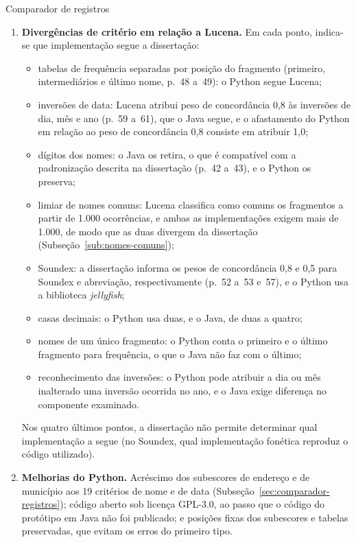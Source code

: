 \begin{chapter}{Comparador de registros}
\begin{enumerate}
\item \textbf{Divergências de critério em relação a Lucena.} Em cada ponto, indica-se que implementação segue a dissertação:
\begin{itemize}
\item tabelas de frequência separadas por posição do fragmento (primeiro, intermediários e último nome, p.~48 a~49): o Python segue Lucena;
\item inversões de data: Lucena atribui peso de concordância 0,8 às inversões de dia, mês e ano (p.~59 a~61), que o Java segue, e o afastamento do Python em relação ao peso de concordância 0,8 consiste em atribuir 1,0;
\item dígitos dos nomes: o Java os retira, o que é compatível com a padronização descrita na dissertação (p.~42 a~43), e o Python os preserva;
\item limiar de nomes comuns: Lucena classifica como comuns os fragmentos a partir de 1.000 ocorrências, e ambas as implementações exigem mais de 1.000, de modo que as duas divergem da dissertação (Subseção~\ref{sub:nomes-comuns});
\item Soundex: a dissertação informa os pesos de concordância 0,8 e 0,5 para Soundex e abreviação, respectivamente (p.~52 a~53 e~57), e o Python usa a biblioteca \textit{jellyfish};
\item casas decimais: o Python usa duas, e o Java, de duas a quatro;
\item nomes de um único fragmento: o Python conta o primeiro e o último fragmento para frequência, o que o Java não faz com o último;
\item reconhecimento das inversões: o Python pode atribuir a dia ou mês inalterado uma inversão ocorrida no ano, e o Java exige diferença no componente examinado.
\end{itemize}
Nos quatro últimos pontos, a dissertação não permite determinar qual implementação a segue (no Soundex, qual implementação fonética reproduz o código utilizado).

\item \textbf{Melhorias do Python.} Acréscimo dos subescores de endereço e de município aos 19 critérios de nome e de data (Subseção~\ref{sec:comparador-registros}); código aberto sob licença GPL-3.0, ao passo que o código do protótipo em Java não foi publicado; e posições fixas dos subescores e tabelas preservadas, que evitam os erros do primeiro tipo.


\end{enumerate}
\end{chapter}
